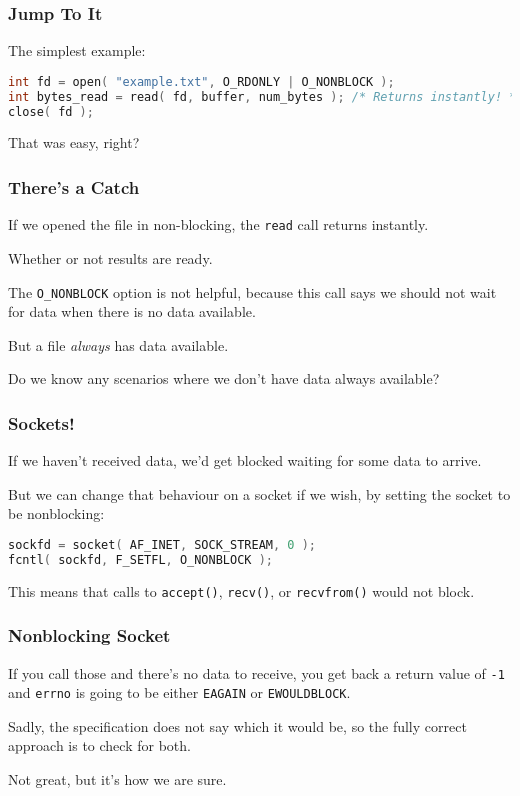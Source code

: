 \begin{frame}[fragile]
	\frametitle{Jump To It}

	The simplest example:

	\begin{lstlisting}[language=C]
int fd = open( "example.txt", O_RDONLY | O_NONBLOCK );
int bytes_read = read( fd, buffer, num_bytes ); /* Returns instantly! */
close( fd );
\end{lstlisting}

	That was easy, right?

\end{frame}


\begin{frame}
	\frametitle{There's a Catch}

	If we opened the file in non-blocking, the \texttt{read} call returns instantly.

	Whether or not results are ready.

	The \texttt{O\_NONBLOCK} option is not helpful, because this call says we should not wait for data when there is no data available.

	But a file \textit{always} has data available.

	Do we know any scenarios where we don't have data always available?

\end{frame}


\begin{frame}[fragile]
	\frametitle{Sockets!}

	If we haven't received data, we'd get blocked waiting for some data to arrive.

	But we can change that behaviour on a socket if we wish, by setting the socket to be nonblocking:

	\begin{lstlisting}[language=C]
sockfd = socket( AF_INET, SOCK_STREAM, 0 );
fcntl( sockfd, F_SETFL, O_NONBLOCK );
\end{lstlisting}

	This means that calls to \texttt{accept()}, \texttt{recv()}, or \texttt{recvfrom()} would not block.

\end{frame}

\begin{frame}
	\frametitle{Nonblocking Socket}

	If you call those and there's no data to receive, you get back a return value of \texttt{-1} and \texttt{errno} is going to be either \texttt{EAGAIN} or \texttt{EWOULDBLOCK}.

	Sadly, the specification does not say which it would be, so the fully correct approach is to check for both.

	Not great, but it's how we are sure.

\end{frame}


